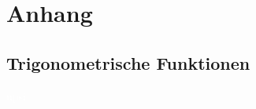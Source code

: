 \newpage
\section{Anhang}

\subsection{Trigonometrische Funktionen}
\textcolor{white}{upsi}\\




\begin{minipage}{\linewidth}

\def\colgray{gray}
\def\colblue{blue}
\def\colred{red}
\def\colblack{black}
\renewcommand{\arraystretch}{3.14159265}

\centering


\end{minipage}
